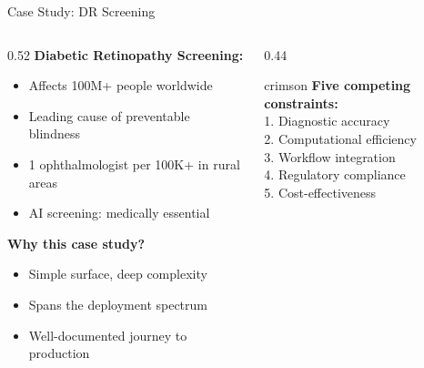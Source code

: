 \documentclass[aspectratio=169, 12pt]{beamer}
\begin{document}
\begin{frame}{Case Study: DR Screening}
\note{
%
%
%
%
}

\footnotesize
\begin{columns}[T]
  \begin{column}{0.52\textwidth}
    \textbf{Diabetic Retinopathy Screening:}
    \begin{itemize}\setlength\itemsep{0pt}
      \item Affects 100M+ people worldwide
      \item Leading cause of preventable blindness
      \item 1 ophthalmologist per 100K+ in rural areas
      \item AI screening: medically essential
    \end{itemize}

    \vspace{0.05cm}
    \textbf{Why this case study?}
    \begin{itemize}\setlength\itemsep{0pt}
      \item Simple surface, deep complexity
      \item Spans the deployment spectrum
      \item Well-documented journey to production
    \end{itemize}
  \end{column}
  \begin{column}{0.44\textwidth}
    \begin{mlsyscard}{crimson}
    \textbf{Five competing constraints:}\\[0.05cm]
    {\scriptsize
    1. Diagnostic accuracy\\
    2. Computational efficiency\\
    3. Workflow integration\\
    4. Regulatory compliance\\
    5. Cost-effectiveness}
    \end{mlsyscard}


\end{column}
\end{columns}
\end{frame}
\end{document}
